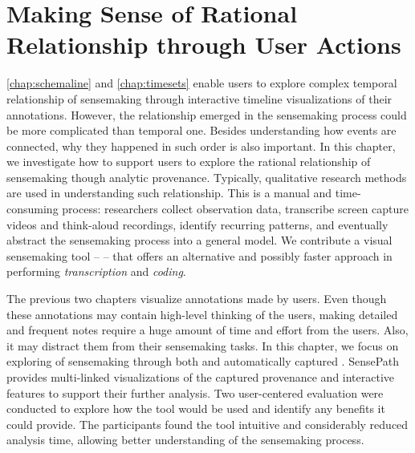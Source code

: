 \chapter{Making Sense of Rational Relationship through User Actions}
\label{chap:sensepath}

\graphicspath{{Chapter5/figures/}}

\autoref{chap:schemaline} and \autoref{chap:timesets} enable users to explore complex temporal relationship of sensemaking through interactive timeline visualizations of their annotations. However, the relationship emerged in the sensemaking process could be more complicated than temporal one. Besides understanding how events are connected, why they happened in such order is also important. In this chapter, we investigate how to support users to explore the rational relationship of sensemaking though analytic provenance. Typically, qualitative research methods are used in understanding such relationship. This is a manual and time-consuming process: researchers collect observation data, transcribe screen capture videos and think-aloud recordings, identify recurring patterns, and eventually abstract the sensemaking process into a general model. We contribute a visual sensemaking tool -- \emph{} -- that offers an alternative and possibly faster approach in performing \emph{transcription} and \emph{coding}. 

The previous two chapters visualize annotations made by users. Even though these annotations may contain high-level thinking of the users, making detailed and frequent notes require a huge amount of time and effort from the users. Also, it may distract them from their sensemaking tasks. In this chapter, we focus on exploring  of sensemaking through both  and automatically captured . SensePath provides multi-linked visualizations of the captured provenance and interactive features to support their further analysis. Two user-centered evaluation were conducted to explore how the tool would be used and identify any benefits it could provide. The participants found the tool intuitive and considerably reduced analysis time, allowing better understanding of the sensemaking process.






